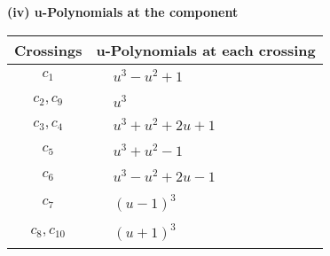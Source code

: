 \documentclass[1p]{elsarticle_modified}
\theoremstyle{definition}
\begin{document}
\newpage\renewcommand{\arraystretch}{1}
\flushleft \textbf{(iv) u-Polynomials at the component}\newline \\
\begin{tabular}{m{50pt}|m{274pt}}
Crossings & \hspace{64pt}u-Polynomials at each crossing \\
\hline $$\begin{aligned}c_{1}\end{aligned}$$&$\begin{aligned}
&u^3- u^2+1
\end{aligned}$\\
\hline $$\begin{aligned}c_{2},c_{9}\end{aligned}$$&$\begin{aligned}
&u^3
\end{aligned}$\\
\hline $$\begin{aligned}c_{3},c_{4}\end{aligned}$$&$\begin{aligned}
&u^3+u^2+2 u+1
\end{aligned}$\\
\hline $$\begin{aligned}c_{5}\end{aligned}$$&$\begin{aligned}
&u^3+u^2-1
\end{aligned}$\\
\hline $$\begin{aligned}c_{6}\end{aligned}$$&$\begin{aligned}
&u^3- u^2+2 u-1
\end{aligned}$\\
\hline $$\begin{aligned}c_{7}\end{aligned}$$&$\begin{aligned}
&(u-1)^3
\end{aligned}$\\
\hline $$\begin{aligned}c_{8},c_{10}\end{aligned}$$&$\begin{aligned}
&(u+1)^3
\end{aligned}$\\
\hline
\end{tabular}\\~\\
\newpage\renewcommand{\arraystretch}{1}
\end{document}
